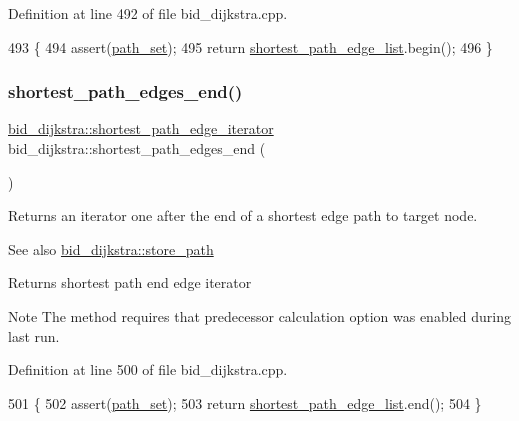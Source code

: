 Definition at line 492 of file bid\+\_\+dijkstra.\+cpp.


\begin{DoxyCode}
493 \{
494     assert(\mbox{\hyperlink{classbid__dijkstra_aa7b329f69600fffae2753f87501dab9d}{path\_set}});
495     \textcolor{keywordflow}{return} \mbox{\hyperlink{classbid__dijkstra_a4b7bdbc4d016748b40ca925cf1e6f778}{shortest\_path\_edge\_list}}.begin();
496 \}
\end{DoxyCode}
\mbox{\label{classbid__dijkstra_a0c31fda13205cd7905ff2400c60bb5e2}} 
\subsubsection{\texorpdfstring{shortest\+\_\+path\+\_\+edges\+\_\+end()}{shortest\_path\_edges\_end()}}
{\footnotesize\ttfamily \mbox{\hyperlink{classbid__dijkstra_a12c551a4f2fea9d38d2b6488278e3a09}{bid\+\_\+dijkstra\+::shortest\+\_\+path\+\_\+edge\+\_\+iterator}} bid\+\_\+dijkstra\+::shortest\+\_\+path\+\_\+edges\+\_\+end (\begin{DoxyParamCaption}{ }\end{DoxyParamCaption})}



Returns an iterator one after the end of a shortest edge path to target node. 

\begin{DoxySeeAlso}{See also}
\mbox{\hyperlink{classbid__dijkstra_a0032d9b44c8b3f6f5733ff3ef94cf169}{bid\+\_\+dijkstra\+::store\+\_\+path}}
\end{DoxySeeAlso}
\begin{DoxyReturn}{Returns}
shortest path end edge iterator
\end{DoxyReturn}
\begin{DoxyNote}{Note}
The method requires that predecessor calculation option was enabled during last run. 
\end{DoxyNote}


Definition at line 500 of file bid\+\_\+dijkstra.\+cpp.


\begin{DoxyCode}
501 \{
502     assert(\mbox{\hyperlink{classbid__dijkstra_aa7b329f69600fffae2753f87501dab9d}{path\_set}});
503     \textcolor{keywordflow}{return} \mbox{\hyperlink{classbid__dijkstra_a4b7bdbc4d016748b40ca925cf1e6f778}{shortest\_path\_edge\_list}}.end();
504 \}
\end{DoxyCode}
\mbox{\label{classbid__dijkstra_a03807bf76c9a75f0e17e79d20d73f48d}} 
